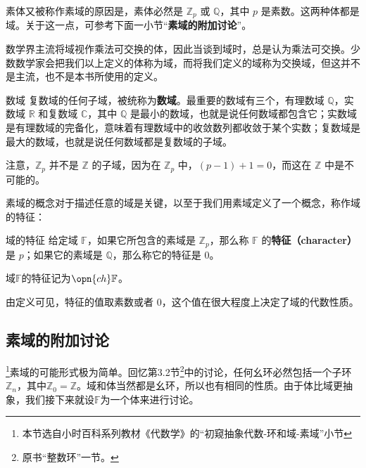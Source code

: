 素体又被称作素域的原因是，素体必然是 $\mathbb{Z}_p$ 或 $\mathbb{Q}$，其中 $p$ 是素数。这两种体都是域。关于这一点，可参考下面一小节“\textbf{素域的附加讨论}”。




数学界主流将域视作乘法可交换的体，因此当谈到域时，总是认为乘法可交换。少数数学家会把我们以上定义的体称为域，而将我们定义的域称为交换域，但这并不是主流，也不是本书所使用的定义。

\begin{example}{数域}
复数域的任何子域，被统称为\textbf{数域}。最重要的数域有三个，有理数域 $\mathbb{Q}$，实数域 $\mathbb{R}$ 和复数域 $\mathbb{C}$，其中 $\mathbb{Q}$ 是最小的数域，也就是说任何数域都包含它；实数域是有理数域的完备化，意味着有理数域中的收敛数列都收敛于某个实数；复数域是最大的数域，也就是说任何数域都是复数域的子域。

注意，$\mathbb{Z}_p$ 并不是 $\mathbb{Z}$ 的子域，因为在 $\mathbb{Z}_p$ 中，$(p-1)+1=0$，而这在 $\mathbb{Z}$ 中是不可能的。
\end{example}

素域的概念对于描述任意的域是关键，以至于我们用素域定义了一个概念，称作域的特征：

\begin{definition}{域的特征}\label{def_field_2}
给定域 $\mathbb{F}$，如果它所包含的素域是 $\mathbb{Z}_p$，那么称 $\mathbb{F}$ 的\textbf{特征（character）}是 $p$；如果它的素域是 $\mathbb{Q}$，那么称它的特征是 $0$。

域$\mathbb{F}$的特征记为$\opn{ch}\mathbb{F}$。
\end{definition}

由定义可见，特征的值取素数或者 $0$，这个值在很大程度上决定了域的代数性质。


\subsection{素域的附加讨论}

\footnote{本节选自小时百科系列教材《代数学》的“初窥抽象代数-环和域-素域”小节}素域的可能形式极为简单。回忆第3.2节\footnote{原书“整数环”一节。}中的讨论，任何幺环必然包括一个子环$\mathbb{Z}_n$，其中$\mathbb{Z}_0=\mathbb{Z}$。域和体当然都是幺环，所以也有相同的性质。由于体比域更抽象，我们接下来就设$\mathbb{F}$为一个体来进行讨论。

